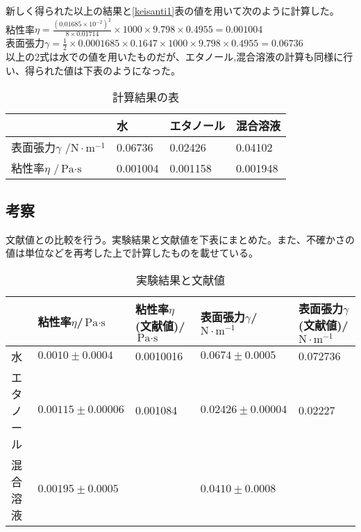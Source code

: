 \documentclass{jsarticle}
\begin{document}
新しく得られた以上の結果と\ref{keisanti1}表の値を用いて次のように計算した。\\
粘性率$\eta = \frac{(0.01685\times 10^{-2})^2}{8\times 0.01714}\times 1000\times 9.798\times 0.4955 = 0.001004$\\
表面張力$\gamma = \frac{1}{2}\times 0.0001685\times 0.1647\times 1000\times 9.798\times 0.4955 = 0.06736$\\
以上の2式は水での値を用いたものだが、エタノール,混合溶液の計算も同様に行い、得られた値は下表のようになった。

\begin{table}[H]
\centering
\caption{計算結果の表}
\label{kekka1}
\begin{tabular}{|l|l|l|l|}
\hline
      & 水              & エタノール          & 混合溶液           \\ \hline
表面張力$\gamma$ /$\textrm{N}\cdot \textrm{m}^{-1}$ & 0.06736    & 0.02426    & 0.04102   \\ \hline
粘性率$\eta$ /$\textrm{Pa}\cdot\textrm{s}$  & 0.001004 & 0.001158 & 0.001948 \\ \hline
\end{tabular}
\end{table}

\subsection{考察}

文献値との比較を行う。実験結果と文献値を下表にまとめた。また、不確かさの値は単位などを再考した上で計算したものを載せている。

\begin{table}[H]
\centering
\caption{実験結果と文献値}
\label{my-label}
\begin{tabular}{|l|l|l|l|l|}
\hline
      & 粘性率$\eta$/$\textrm{Pa}\cdot\textrm{s}$       & 粘性率$\eta$(文献値)/$\textrm{Pa}\cdot\textrm{s}$  & 表面張力$\gamma$/$\textrm{N}\cdot \textrm{m}^{-1}$   & 表面張力$\gamma$(文献値)/$\textrm{N}\cdot \textrm{m}^{-1}$ \\ \hline
水        & $0.0010 \pm 0.0004$   & 0.0010016   & $0.0674 \pm 0.0005$   & 0.072736   \\ \hline
エタノール  & $0.00115 \pm 0.00006$ & 0.001084     & $0.02426 \pm 0.00004$ & 0.02227    \\ \hline
混合溶液   & $0.00195 \pm 0.0005$   &             & $0.0410 \pm 0.0008$   &            \\ \hline
\end{tabular}
\end{table}
\end{document}
